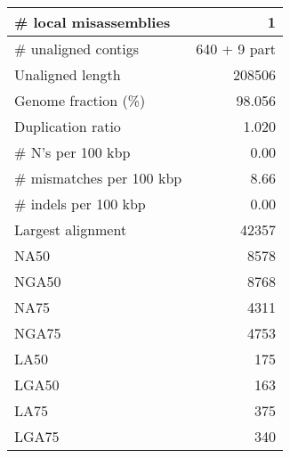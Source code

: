 \documentclass[12pt,a4paper]{article}
\begin{document}
\begin{table}[ht]
\begin{center}
\begin{tabular}{|l*{1}{|r}|}
\# local misassemblies & 1 \\ \hline
\# unaligned contigs & 640 + 9 part \\ \hline
Unaligned length & 208506 \\ \hline
Genome fraction (\%) & 98.056 \\ \hline
Duplication ratio & 1.020 \\ \hline
\# N's per 100 kbp & 0.00 \\ \hline
\# mismatches per 100 kbp & 8.66 \\ \hline
\# indels per 100 kbp & 0.00 \\ \hline
Largest alignment & 42357 \\ \hline
NA50 & 8578 \\ \hline
NGA50 & 8768 \\ \hline
NA75 & 4311 \\ \hline
NGA75 & 4753 \\ \hline
LA50 & 175 \\ \hline
LGA50 & 163 \\ \hline
LA75 & 375 \\ \hline
LGA75 & 340 \\ \hline
\end{tabular}
\end{center}
\end{table}
\end{document}
